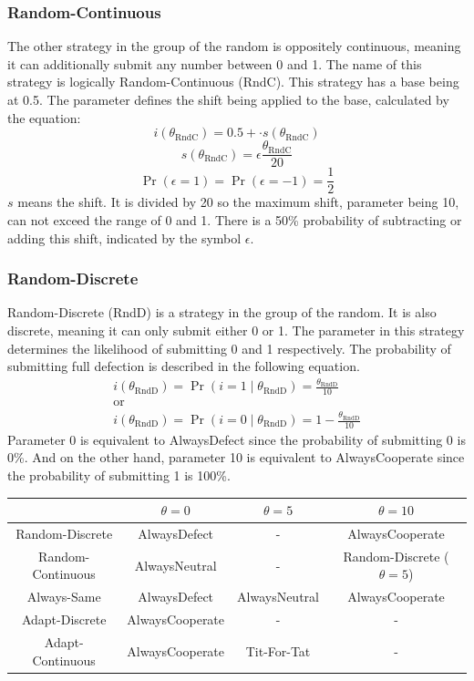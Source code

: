 \documentclass{article}
\begin{document}
\subsubsection*{Random-Continuous}
The other strategy in the group of the random is oppositely continuous, meaning it can additionally submit any number between 0 and 1.
The name of this strategy is logically Random-Continuous (RndC).
This strategy has a base being at 0.5.
The parameter defines the shift being applied to the base, calculated by the equation:
$$i(\theta_{\mathrm{RndC}}) = 0.5 + \cdot s(\theta_{\mathrm{RndC}})$$
$$s(\theta_{\mathrm{RndC}}) = \epsilon \frac{\theta_{\mathrm{RndC}}}{20}$$
$$\Pr(\epsilon = 1) = \Pr(\epsilon = -1) = \frac{1}{2}$$
$s$ means the shift.
It is divided by 20 so the maximum shift, parameter being 10, can not exceed the range of 0 and 1.
There is a 50\% probability of subtracting or adding this shift, indicated by the symbol $\epsilon$.\\

\subsubsection*{Random-Discrete}
Random-Discrete (RndD) is a strategy in the group of the random.
It is also discrete, meaning it can only submit either 0 or 1.
The parameter in this strategy determines the likelihood of submitting 0 and 1 respectively.
The probability of submitting full defection is described in the following equation.
$$
\begin{array}{c}
i(\theta_{\mathrm{RndD}}) = \Pr(i = 1 \mid \theta_{\mathrm{RndD}}) = \frac{\theta_{\mathrm{RndD}}}{10}\\
\mathrm{or}\\
i(\theta_{\mathrm{RndD}}) = \Pr(i = 0 \mid \theta_{\mathrm{RndD}}) = 1 - \frac{\theta_{\mathrm{RndD}}}{10}
\end{array}
$$
Parameter 0 is equivalent to AlwaysDefect since the probability of submitting 0 is 0\%.
And on the other hand, parameter 10 is equivalent to AlwaysCooperate since the probability of submitting 1 is 100\%.\\

\begin{center}
\begin{tabular}{ c|c|c|c }
   & $\theta = 0$ & $\theta = 5$ & $\theta = 10$ \\ 
   \hline
	Random-Discrete & AlwaysDefect & - & AlwaysCooperate \\  
   \hline
	Random-Continuous & AlwaysNeutral & - & Random-Discrete ($\theta = 5$) \\
   \hline
	Always-Same & AlwaysDefect & AlwaysNeutral & AlwaysCooperate \\
   \hline
	Adapt-Discrete & AlwaysCooperate & - & -\\
   \hline
	Adapt-Continuous & AlwaysCooperate & Tit-For-Tat & -
\end{tabular}
\end{center}
\end{document}
